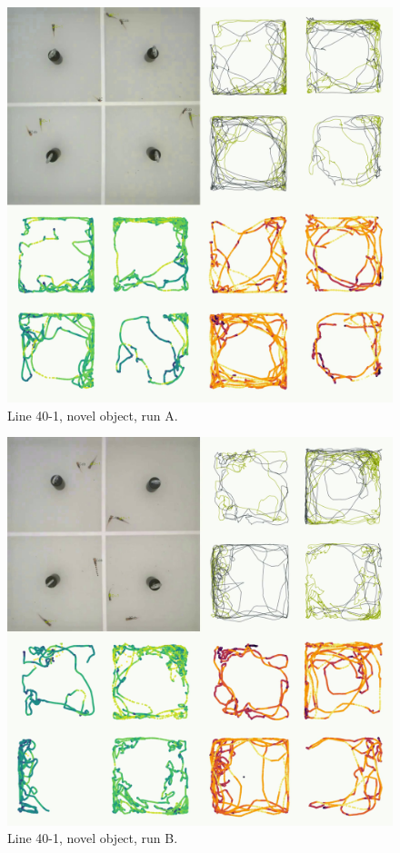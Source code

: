 \documentclass[
]{book}
\begin{document}
\begin{figure}
\includegraphics[width=1\linewidth]{figs/mikk_behaviour/four_panel_plots/novel_object_20191114_1217_40-1_L_A_300} \caption{Line 40-1, novel object, run A.}\label{fig:4p-40-1-no-A}
\end{figure}



\begin{figure}
\includegraphics[width=1\linewidth]{figs/mikk_behaviour/four_panel_plots/novel_object_20191118_1129_40-1_R_B_300} \caption{Line 40-1, novel object, run B.}\label{fig:4p-40-1-no-B}
\end{figure}
\end{document}
